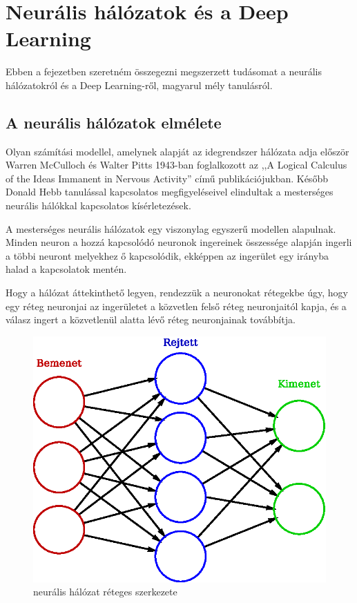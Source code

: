 \chapter{Neurális hálózatok és a Deep Learning}\label{chap:neuralis-halozatok-es-a-deep-learning}
Ebben a fejezetben szeretném összegezni megszerzett tudásomat a neurális hálózatokról és a Deep Learning-ről, magyarul mély tanulásról. 

\section{A neurális hálózatok elmélete}
\label{sect:neuralNetworkTheory}
Olyan számítási modellel, amelynek alapját az idegrendszer hálózata adja először  Warren McCulloch és Walter Pitts 1943-ban foglalkozott az ,,A Logical Calculus of the Ideas Immanent in Nervous Activity'' című publikációjukban. Később Donald Hebb tanulással kapcsolatos megfigyeléseivel elindultak a mesterséges neurális hálókkal kapcsolatos kísérletezések.\cite{neural2006}

A mesterséges neurális hálózatok egy viszonylag egyszerű modellen alapulnak. Minden neuron a hozzá kapcsolódó neuronok ingereinek összessége alapján ingerli a többi neuront melyekhez ő kapcsolódik, ekképpen az ingerület egy irányba halad a kapcsolatok mentén.

Hogy a hálózat áttekinthető legyen, rendezzük a neuronokat rétegekbe úgy, hogy egy réteg neuronjai az ingerületet a közvetlen felső réteg neuronjaitól kapja, és a válasz ingert a közvetlenül alatta lévő réteg neuronjainak továbbítja.

\begin{figure}[h]
	\centering
	\includegraphics[width=0.3\columnwidth]{fig/neural_network}
	\caption{neurális hálózat réteges szerkezete \protect \footnotemark}
	\label{fig:neuralNet}
\end{figure}

